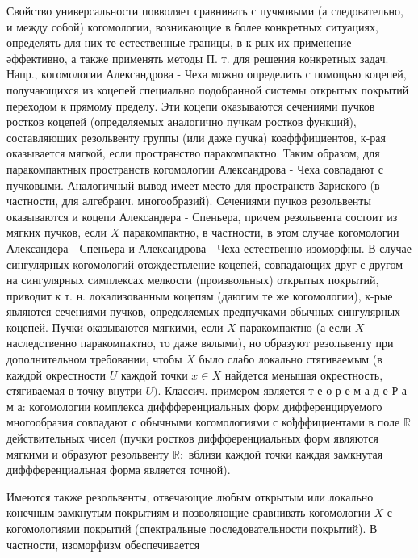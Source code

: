 \documentclass[10pt]{article}
\begin{document}
Свойство универсальности повволяет сравнивать с пучковыми (а следовательно, и между собой) когомологии, возникающие в более конкретных ситуациях, определять для них те естественные границы, в к-рых их применение әффективно, а также применять методы П. т. для решения конкретных задач. Напр., когомологии Александрова - Чеха можно определить с помощью коцепей, получающихся из коцепей специально подобранной системы открытых покрытий переходом к прямому пределу. Эти коцепи оказываются сечениями пучков ростков коцепей (определяемых аналогично пучкам ростков функций), составляющих резольвенту группы (или даже пучка) коәфффициентов, к-рая оказывается мягкой, если пространство паракомпактно. Таким образом, для паракомпактных пространств когомологии Александрова - Чеха совпадают с пучковыми. Аналогичный вывод имеет место для пространств Зариского (в частности, для алгебраич. многообразий). Сечениями пучков резольвенты оказываются и коцепи Александера - Спеньера, причем резольвента состоит из мягких пучков, если $X$ паракомпактно, в частности, в этом случае когомологии Александера - Спеньера и Александрова - Чеха естественно изоморфны. В случае сингулярных когомологий отождествление коцепей, совпадающих друг с другом на сингулярных симплексах мелкости (произвольных) открытых покрытий, приводит к т. н. локализованным коцепям (даюгим те же когомологии), к-рые являются сечениями пучков, определяемых предпучками обычных сингулярных коцепей. Пучки оказываются мягкими, если $X$ паракомпактно (а если $X$ наследственно паракомпактно, то даже вялыми), но образуют резольвенту при дополнительном требовании, чтобы $X$ было слабо локально стягиваемым (в каждой окрестности $U$ каждой точки $x \in X$ найдется менышая окрестность, стягиваемая в точку внутри $U)$. Классич. примером является т е о р е м а д е Р а м а: когомологии комплекса диффференциальных форм дифференцируемого многообразия совпадают с обычными когомологиями с кођффициентами в поле $\mathbb{R}$ действительных чисел (пучки ростков диффференциальных форм являются мягкими и образуют резольвенту $\mathbb{R}:$ вблизи каждой точки каждая замкнутая диффференциальная форма является точной).



Имеются также резольвенты, отвечающие любым открытым или локально конечным замкнутым покрытиям и позволяющие сравнивать когомологии $X$ с когомологиями покрытий (спектральные последовательности покрытий). В частности, изоморфизм обеспечивается
\end{document}
